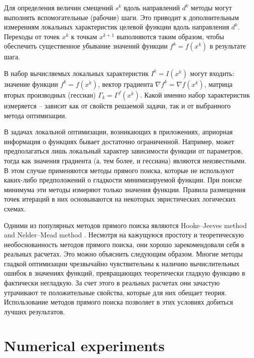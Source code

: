 \documentclass{svproc}
\begin{document}
Для определения величин смещений $s^k$ вдоль направлений $d^k$ методы могут выполнять вспомогательные (рабочие) шаги. Это приводит к дополнительным измерениям локальных характеристик целевой функции вдоль направления $d^k$. Переходы от точек $x^k$ к точкам $x^{k+1}$ выполняются таким образом, чтобы обеспечить существенное убывание значений функции $f^k = f( x^k )$ в результате шага.

В набор вычисляемых локальных характеристик $I^k=I(x^k)$ могут входить: значение функции $f^k = f( x^k )$, вектор градиента $\nabla f^k = \nabla f(x^k)$, матрица вторых производных (гессиан) $\Gamma_k=\Gamma^f(x^k)$. Какой именно набор характеристик измеряется -- зависит как от свойств решаемой задачи, так и от выбранного метода оптимизации.

В задачах локальной оптимизации, возникающих в приложениях, априорная информация о функциях бывает достаточно ограниченной. Например, может предполагаться лишь локальный характер зависимости функции от параметров, тогда как значения градиента (а, тем более, и гессиана) являются неизвестными. В этом случае применяются методы прямого поиска, которые не используют каких-либо предположений о гладкости минимизируемой функции. При поиске минимума эти методы измеряют только значения функции. Правила размещения точек итераций в них основываются на некоторых эвристических логических схемах. 

Одними из популярных методов прямого поиска являются Hooke--Jeeves method \cite{HookJeeves} and Nelder--Mead method \cite{NelderMead}. Несмотря на кажущуюся простоту и теоретическую необоснованность методов прямого поиска, они хорошо зарекомендовали себя в реальных расчетах. Это можно объяснить следующим образом. Многие методы гладкой оптимизации чрезвычайно чувствительны к наличию вычислительных ошибок в значениях функций, превращающих теоретически гладкую функцию в фактически негладкую. За счет этого в реальных расчетах они зачастую утрачивают те положительные свойства, которые для них обещает теория. Использование методов прямого поиска позволяет в этих условиях добиться лучших результатов.







\section{Numerical experiments}
\end{document}
